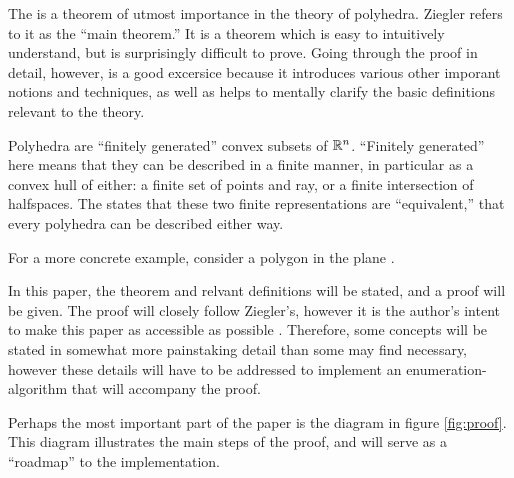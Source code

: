 
The \MWT{} is a theorem of utmost importance in the theory of polyhedra.  Ziegler refers to it as the ``main theorem.''  It is a theorem which is easy to intuitively understand, but is surprisingly difficult to prove.  Going through the proof in detail, however, is a good excersice because it introduces various other imporant notions and techniques, as well as helps to mentally clarify the basic definitions relevant to the theory.

Polyhedra are ``finitely generated'' convex subsets of $\mathbb{R}^n$.  ``Finitely generated'' here means that they can be described in a finite manner, in particular as a convex hull of either: a finite set of points and ray, or a finite intersection of halfspaces.  The \MWT{} states that these two finite representations are ``equivalent,'' that every polyhedra can be described either way.

For a more concrete example, consider a polygon in the plane .

In this paper, the theorem and relvant definitions will be stated, and a proof will be given.  The proof will closely follow Ziegler's, however it is the author's intent to make this paper as accessible as possible .  Therefore, some concepts will be stated in somewhat more painstaking detail than some may find necessary, however these details will have to be addressed to implement an enumeration-algorithm that will accompany the proof.

Perhaps the most important part of the paper is the diagram in figure \ref{fig:proof}.  This diagram illustrates the main steps of the proof, and will serve as a ``roadmap'' to the implementation.

